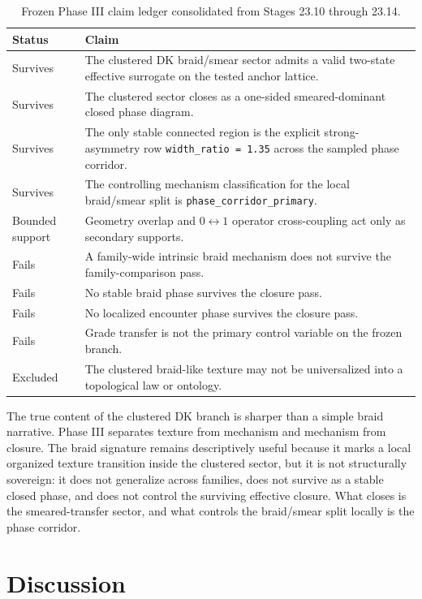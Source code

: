 \documentclass[11pt]{article}
\begin{document}
\begin{table}[t]
\centering
\small
\begin{tabular}{@{}p{1.1in}p{4.9in}@{}}
\toprule
Status & Claim \\
\midrule
Survives & The clustered DK braid/smear sector admits a valid two-state effective surrogate on the tested anchor lattice. \\
Survives & The clustered sector closes as a one-sided smeared-dominant closed phase diagram. \\
Survives & The only stable connected region is the explicit strong-asymmetry row \texttt{width\_ratio = 1.35} across the sampled phase corridor. \\
Survives & The controlling mechanism classification for the local braid/smear split is \texttt{phase\_corridor\_primary}. \\
Bounded support & Geometry overlap and $0 \leftrightarrow 1$ operator cross-coupling act only as secondary supports. \\
Fails & A family-wide intrinsic braid mechanism does not survive the family-comparison pass. \\
Fails & No stable braid phase survives the closure pass. \\
Fails & No localized encounter phase survives the closure pass. \\
Fails & Grade transfer is not the primary control variable on the frozen branch. \\
Excluded & The clustered braid-like texture may not be universalized into a topological law or ontology. \\
\bottomrule
\end{tabular}
\caption{Frozen Phase III claim ledger consolidated from Stages 23.10 through 23.14.}
\label{tab:claim_ledger}
\end{table}

The true content of the clustered DK branch is sharper than a simple braid narrative. Phase III separates texture from mechanism and mechanism from closure. The braid signature remains descriptively useful because it marks a local organized texture transition inside the clustered sector, but it is not structurally sovereign: it does not generalize across families, does not survive as a stable closed phase, and does not control the surviving effective closure. What closes is the smeared-transfer sector, and what controls the braid/smear split locally is the phase corridor.

\section{Discussion}
\end{document}
